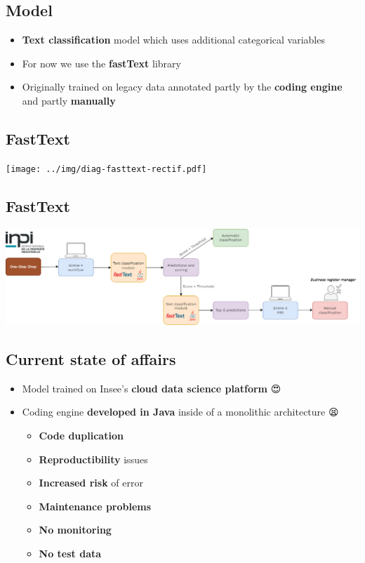 \documentclass[
  letterpaper,
  DIV=11,
  numbers=noendperiod]{scrartcl}
\providecommand{\tightlist}{%
  \setlength{\itemsep}{0pt}\setlength{\parskip}{0pt}}\usepackage{longtable,booktabs,array}
\begin{document}
\subsection{Model}\label{model}

\begin{itemize}
\tightlist
\item
  {\textbf{Text classification}} model which uses additional categorical
  variables
\item
  For now we use the {\textbf{fastText}} library
\item
  Originally trained on legacy data annotated partly by the
  {\textbf{coding engine}} and partly {\textbf{manually}}
\end{itemize}

\subsection{FastText}\label{fasttext}

\begin{center}
\texttt{[image: ../img/diag-fasttext-rectif.pdf]}
\end{center}

\subsection{FastText}\label{fasttext-1}

\begin{center}
\includegraphics{../img/orga-post-prod-sirene4-en.png}
\end{center}

\subsection{Current state of affairs}\label{current-state-of-affairs}

\begin{itemize}
\tightlist
\item
  Model trained on Insee's {\textbf{cloud data science platform}} 😍
\item
  Coding engine {\textbf{developed in Java}} inside of a monolithic
  architecture 😫

  \begin{itemize}
  \tightlist
  \item
    {\textbf{Code duplication}}
  \item
    {\textbf{Reproductibility}} issues
  \item
    {\textbf{Increased risk}} of error
  \item
    {\textbf{Maintenance problems}}
  \item
    {\textbf{No monitoring}}
  \item
    {\textbf{No test data}}
  \end{itemize}
\end{itemize}
\end{document}
